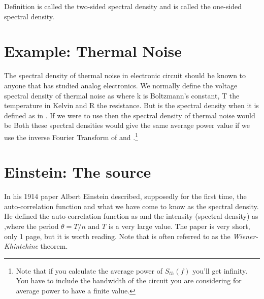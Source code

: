 \documentclass[final,a4paper]{IEEEtran}
\begin{document}
Definition  is  called the two-sided spectral density
and  is called the one-sided spectral density.

\section{Example: Thermal Noise}
The spectral density of thermal noise in electronic circuit should be
known to anyone that has studied analog electronics. We normally
define the voltage spectral density of thermal noise as
where k is Boltzmann's constant, T the temperature in Kelvin and R the
resistance. But  is the spectral density when it is
defined as in . If we were to use  then the
spectral density of thermal noise would be
Both these spectral densities would give the same average power
value if we use the inverse Fourier Transform of  and
.\footnote{Note that if you calculate the average power of
  $S_{th}(f)$ you'll get infinity. You have to include the bandwidth of
  the circuit you are considering for average power to have a finite value.}

\section{Einstein: The source}
In his 1914 paper \cite{einstein14} Albert Einstein described,
supposedly for the first time, the auto-correlation function and
what we have come to know as the spectral density. He defined the
auto-correlation function as
and the intensity (spectral density) as
,where the period $\theta = T/n$ and $T$ is a very large value. The
paper is very short, only 1 page, but it is worth reading. Note that
 is often referred to as the {\em Wiener-Khintchine}  theorem.




\end{document}
